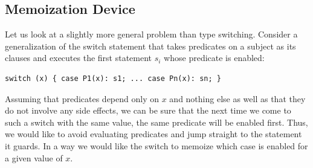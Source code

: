 %

\subsection{Memoization Device}
\label{sec:memdev}

Let us look at a slightly more general problem than type switching. Consider a 
generalization of the switch statement that takes predicates on a subject as its 
clauses and executes the first statement $s_i$ whose predicate is enabled: 

\begin{lstlisting}[keepspaces]
switch (x) { case P1(x): s1; ... case Pn(x): sn; }
\end{lstlisting}

\noindent
Assuming that predicates depend only on $x$ and nothing else as well as that 
they do not involve any side effects, we can be sure that the next time we come 
to such a switch with the same value, the same predicate will be enabled 
first. Thus, we would like to avoid evaluating predicates and jump straight to 
the statement it guards. In a way we would like the switch to memoize which 
case is enabled for a given value of $x$.

